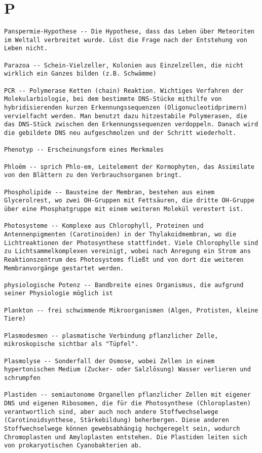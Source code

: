 \documentclass{article}
\begin{document}
\section{P}
\begin{verbatim}
Panspermie-Hypothese -- Die Hypothese, dass das Leben über Meteoriten im Weltall verbreitet wurde. Löst die Frage nach der Entstehung von Leben nicht. 

Parazoa -- Schein-Vielzeller, Kolonien aus Einzelzellen, die nicht wirklich ein Ganzes bilden (z.B. Schwämme)

PCR -- Polymerase Ketten (chain) Reaktion. Wichtiges Verfahren der Molekularbiologie, bei dem bestimmte DNS-Stücke mithilfe von hybridisierenden kurzen Erkennungssequenzen (Oligonucleotidprimern) vervielfacht werden. Man benutzt dazu hitzestabile Polymerasen, die das DNS-Stück zwischen den Erkennungssequenzen verdoppeln. Danach wird die gebildete DNS neu aufgeschmolzen und der Schritt wiederholt.

Phenotyp -- Erscheinungsform eines Merkmales

Phloëm -- sprich Phlo-em, Leitelement der Kormophyten, das Assimilate von den Blättern zu den Verbrauchsorganen bringt.

Phospholipide -- Bausteine der Membran, bestehen aus einem Glycerolrest, wo zwei OH-Gruppen mit Fettsäuren, die dritte OH-Gruppe über eine Phosphatgruppe mit einem weiteren Molekül verestert ist.

Photosysteme -- Komplexe aus Chlorophyll, Proteinen und Antennenpigmenten (Carotinoiden) in der Thylakoidmembran, wo die Lichtreaktionen der Photosynthese stattfindet. Viele Chlorophylle sind zu Lichtsammelkomplexen vereinigt, wobei nach Anregung ein Strom ans Reaktionszentrum des Photosystems fließt und von dort die weiteren Membranvorgänge gestartet werden.

physiologische Potenz -- Bandbreite eines Organismus, die aufgrund seiner Physiologie möglich ist

Plankton -- frei schwimmende Mikroorganismen (Algen, Protisten, kleine Tiere)

Plasmodesmen -- plasmatische Verbindung pflanzlicher Zelle, mikroskopische sichtbar als "Tüpfel".

Plasmolyse -- Sonderfall der Osmose, wobei Zellen in einem hypertonischen Medium (Zucker- oder Salzlösung) Wasser verlieren und schrumpfen

Plastiden -- semiautonome Organellen pflanzlicher Zellen mit eigener DNS und eigenen Ribosomen, die für die Photosynthese (Chloroplasten) verantwortlich sind, aber auch noch andere Stoffwechselwege (Carotinoidsynthese, Stärkebildung) beherbergen. Diese anderen Stoffwechselwege können gewebsabhängig hochgeregelt sein, wodurch Chromoplasten und Amyloplasten entstehen. Die Plastiden leiten sich von prokaryotischen Cyanobakterien ab.


\end{verbatim}
\end{document}
